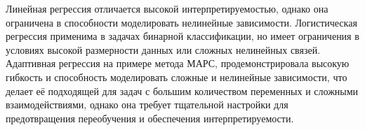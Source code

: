 Линейная регрессия отличается высокой интерпретируемостью, однако она ограничена в способности моделировать нелинейные зависимости.
Логистическая регрессия применима в задачах бинарной классификации, но имеет ограничения в условиях высокой размерности данных или сложных нелинейных связей.
Адаптивная регрессия на примере метода МАРС, продемонстрировала высокую гибкость и способность моделировать сложные и нелинейные зависимости, что делает её подходящей для задач с большим количеством переменных и сложными взаимодействиями, однако она требует тщательной настройки для предотвращения переобучения и обеспечения интерпретируемости.